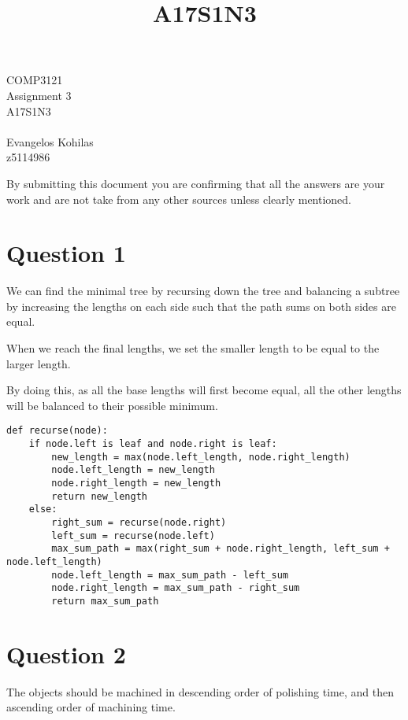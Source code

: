 \documentclass{article}
\title{A17S1N3}
\begin{document}
\begin{center}
    \begin{LARGE}
        COMP3121\\
        Assignment 3\\
        A17S1N3\\
        \hrulefill\\
        Evangelos Kohilas\\
        z5114986\\
        \hrulefill
    \end{LARGE}

    \begin{large}
        By submitting this document you are confirming that all the answers are your work and are not take from any other sources unless clearly mentioned.
    \end{large}

\end{center}

\section*{Question 1}
We can find the minimal tree by recursing down the tree and balancing a subtree by increasing the lengths on each side such that the path sums on both sides are equal.

When we reach the final lengths, we set the smaller length to be equal to the larger length.

By doing this, as all the base lengths will first become equal, all the other lengths will be balanced to their possible minimum.

\begin{verbatim}
def recurse(node):
    if node.left is leaf and node.right is leaf:
        new_length = max(node.left_length, node.right_length)
        node.left_length = new_length
        node.right_length = new_length
        return new_length
    else:
        right_sum = recurse(node.right)
        left_sum = recurse(node.left)
        max_sum_path = max(right_sum + node.right_length, left_sum + node.left_length)
        node.left_length = max_sum_path - left_sum
        node.right_length = max_sum_path - right_sum
        return max_sum_path
\end{verbatim}

\pagebreak
\section*{Question 2}
The objects should be machined in descending order of polishing time, and then ascending order of machining time.
\end{document}
